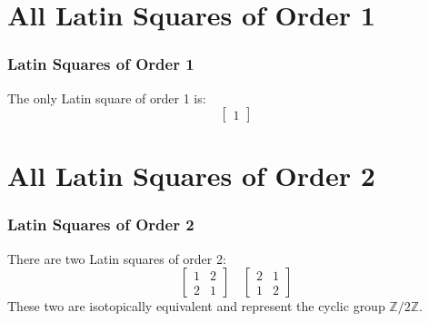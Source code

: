 \documentclass{beamer}
\begin{document}

\section{All Latin Squares of Order 1}
\begin{frame}
\frametitle{Latin Squares of Order 1}
The only Latin square of order 1 is:
\[ 
\begin{bmatrix} 
1 
\end{bmatrix} 
\]
\end{frame}

\section{All Latin Squares of Order 2}
\begin{frame}
\frametitle{Latin Squares of Order 2}
There are two Latin squares of order 2:
\[
\begin{bmatrix}
1 & 2 \\
2 & 1
\end{bmatrix}
\quad
\begin{bmatrix}
2 & 1 \\
1 & 2
\end{bmatrix}
\]
These two are isotopically equivalent and represent the cyclic group \( \mathbb{Z}/2\mathbb{Z} \).
\end{frame}
\end{document}
